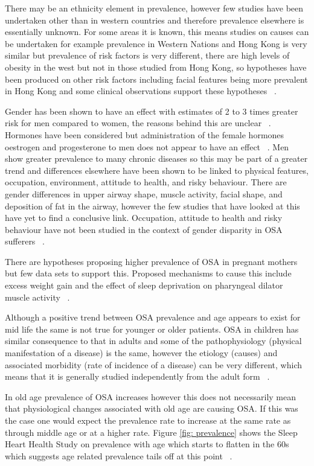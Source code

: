 There may be an ethnicity element in prevalence, however few studies have been undertaken other than in western countries and therefore prevalence elsewhere is essentially unknown. For some areas it is known, this means studies on causes can be undertaken for example prevalence in Western Nations and Hong Kong is very similar but prevalence of risk factors is very different, there are high levels of obesity in the west but not in those studied from Hong Kong, so hypotheses have been produced on other risk factors including facial features being more prevalent in Hong Kong and some clinical observations support these hypotheses ~\cite{ip2001community}.

Gender has been shown to have an effect with estimates of 2 to 3 times greater risk for men compared to women, the reasons behind this are unclear ~\cite{strohl1996recognition}. Hormones have been considered but administration of the female hormones oestrogen and progesterone to men does not appear to have an effect ~\cite{shaver2000review}. Men show greater prevalence to many chronic diseases so this may be part of a greater trend and differences elsewhere have been shown to be linked to physical features, occupation, environment, attitude to health, and risky behaviour. There are gender differences in upper airway shape, muscle activity, facial shape, and deposition of fat in the airway, however the few studies that have looked at this have yet to find a conclusive link. Occupation, attitude to health and risky behaviour have not been studied in the context of gender disparity in OSA sufferers ~\cite{waldron1985we}.

There are hypotheses proposing higher prevalence of OSA in pregnant mothers but few data sets to support this. Proposed mechanisms to cause this include excess weight gain and the effect of sleep deprivation on pharyngeal dilator muscle activity ~\cite{franklin2000snoring}.

Although a positive trend between OSA prevalence and age appears to exist for mid life the same is not true for younger or older patients. OSA in children has similar consequence to that in adults and some of the pathophysiology (physical manifestation of a disease) is the same, however the etiology (causes) and associated morbidity (rate of incidence of a disease) can be very different, which means that it is generally studied independently from the adult form ~\cite{ancoli1991sleep}.

In old age prevalence of OSA increases however this does not necessarily mean that physiological changes associated with old age are causing OSA. If this was the case one would expect the prevalence rate to increase at the same rate as through middle age or at a higher rate. Figure \ref{fig: prevalence} shows the Sleep Heart Health Study on prevalence with age which starts to flatten in the 60s which suggests age related prevalence tails off at this point ~\cite{young1996sleep}.

